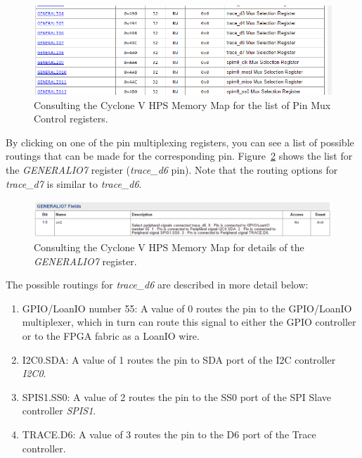 \documentclass[11pt, twoside, pdftex]{article}
\begin{document}
\begin{figure} [H]
\begin{center}
\includegraphics[scale = 0.8]{figures/fig_pinmuxregisters_doc.png}
\end{center}
\caption{Consulting the Cyclone V HPS Memory Map for the list of Pin Mux Control registers.}
\label{fig:pinmuxregisters_doc}
\end{figure}

By clicking on one of the pin multiplexing registers, you can see a list of possible routings that can be made for the corresponding pin. Figure~\ref{fig:generalio7_reg} shows the list for the \textit{GENERALIO7} register (\textit{trace\_d6} pin). Note that the routing options for \textit{trace\_d7} is similar to \textit{trace\_d6}. 

\begin{figure} [H]
\begin{center}
\includegraphics[scale = 0.6]{figures/fig_generalio7_reg.png}
\end{center}
\caption{Consulting the Cyclone V HPS Memory Map for details of the \textit{GENERALIO7} register.}
\label{fig:generalio7_reg}
\end{figure}

\vskip 0.5in
The possible routings for \textit{trace\_d6} are described in more detail below:

\begin{enumerate}
\item GPIO/LoanIO number 55: A value of 0 routes the pin to the GPIO/LoanIO multiplexer, which in turn can route this signal to either the GPIO controller or to the FPGA fabric as a LoanIO wire.
\item I2C0.SDA: A value of 1 routes the pin to SDA port of the I2C controller \textit{I2C0}.
\item SPIS1.SS0: A value of 2 routes the pin to the SS0 port of the SPI Slave controller \textit{SPIS1}.
\item TRACE.D6: A value of 3 routes the pin to the D6 port of the Trace controller. 
\end{enumerate}
\end{document}
